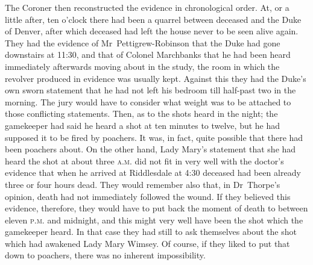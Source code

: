 The Coroner then reconstructed the evidence in chronological order.  At, or a little after, ten o'clock there had been a quarrel between deceased and the Duke of Denver, after which deceased had left the house never to be seen alive again. They had the evidence of Mr~Pettigrew-Robinson that the Duke had gone downstairs at 11:30, and that of Colonel Marchbanks that he had been heard immediately afterwards moving about in the study, the room in which the revolver produced in evidence was usually kept. Against this they had the Duke's own sworn statement that he had not left his bedroom till half-past two in the morning. The jury would have to consider what weight was to be attached to those conflicting statements. Then, as to the shots heard in the night; the gamekeeper had said he heard a shot at ten minutes to twelve, but he had supposed it to be fired by poachers. It was, in fact, quite possible that there had been poachers about. On the other hand, Lady Mary's statement that she had heard the shot at about three \textsc{a.m.} did not fit in very well with the doctor's evidence that when he arrived at Riddlesdale at 4:30 deceased had been already three or four hours dead. They would remember also that, in Dr~Thorpe's opinion, death had not immediately followed the wound. If they believed this evidence, therefore, they would have to put back the moment of death to between eleven \textsc{p.m.} and midnight, and this might very well have been the shot which the gamekeeper heard. In that case they had still to ask themselves about the shot which had awakened Lady Mary Wimsey.  Of course, if they liked to put that down to poachers, there was no inherent impossibility.

